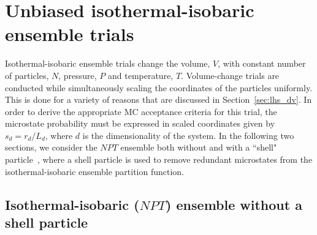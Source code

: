 \documentclass[
  9pt,
  bestpractices,
]{livecoms}
\begin{document}


\section{\label{sec:rhs_npt}Unbiased isothermal-isobaric ensemble trials}

Isothermal-isobaric ensemble trials change the volume, $V$, with constant number of particles, $N$, pressure, $P$ and temperature, $T$.
Volume-change trials are conducted while simultaneously scaling the coordinates of the particles uniformly.
This is done for a variety of reasons that are discussed in Section~\ref{sec:lhs_dv}.
In order to derive the appropriate MC acceptance criteria for this trial, the microstate probability must be expressed in scaled coordinates given by $s_d = r_d/L_d$, where $d$ is the dimensionality of the system.
In the following two sections, we consider the $NPT$ ensemble both without and with a ``shell" particle~\cite{koper_length_1996, corti_deriving_1998, hatch_theory_2024}, where a shell particle is used to remove redundant microstates from the isothermal-isobaric ensemble partition function.

\subsection{\label{sec:rhs_npt_shell}Isothermal-isobaric ($NPT$) ensemble without a shell particle}
\end{document}
